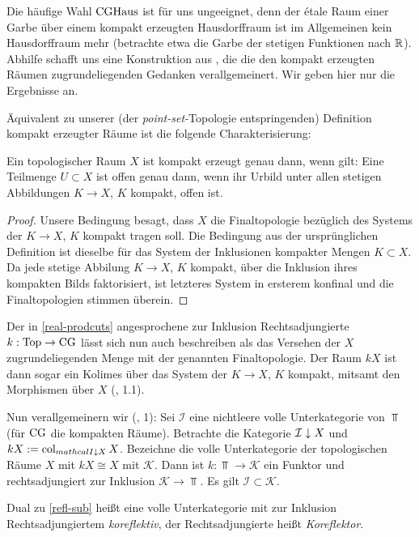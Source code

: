 Die häufige Wahl $\operatorname{CGHaus}$ ist für uns ungeeignet, denn der étale Raum
einer Garbe über einem kompakt erzeugten Hausdorffraum ist im
Allgemeinen kein Hausdorffraum mehr (betrachte etwa die Garbe der
stetigen Funktionen nach $\mathbb{R}$). Abhilfe schafft uns eine Konstruktion
aus \cite{Vogt}, die die den kompakt erzeugten Räumen
zugrundeliegenden Gedanken verallgemeinert. Wir geben hier nur die
Ergebnisse an.

Äquivalent zu unserer (der \emph{point-set-}Topologie entspringenden)
Definition kompakt erzeugter Räume ist die folgende Charakterisierung:
\begin{lemma}
  Ein topologischer Raum $X$ ist kompakt erzeugt genau dann, wenn
  gilt: Eine Teilmenge $U \subset X$ ist offen genau dann, wenn ihr
  Urbild unter allen stetigen Abbildungen $K \to X$, $K$ kompakt,
  offen ist.
\end{lemma}
\begin{proof}
  Unsere Bedingung besagt, dass $X$ die Finaltopologie bezüglich des
  Systems der $K \to X$, $K$ kompakt tragen soll. Die Bedingung aus
  der ursprünglichen Definition ist dieselbe für das System der
  Inklusionen kompakter Mengen $K \subset X$. Da jede stetige Abbilung
  $K \to X$, $K$ kompakt, über die Inklusion ihres kompakten Bilds
  faktorisiert, ist letzteres System in ersterem konfinal und die
  Finaltopologien stimmen überein.
\end{proof}
Der in \ref{real-prodcuts} angesprochene zur Inklusion
Rechtsadjungierte $k: \operatorname{Top} \to \operatorname{CG}$ lässt sich nun auch beschreiben
als das Versehen der $X$ zugrundeliegenden Menge mit der genannten
Finaltopologie. Der Raum $kX$ ist dann sogar ein Kolimes über das
System der $K \to X$, $K$ kompakt, mitsamt den Morphismen über $X$
(\cite{Vogt}, 1.1).

Nun verallgemeinern wir (\cite{Vogt}, 1): Sei $\mathcal{I}$ eine
nichtleere volle Unterkategorie von $\Top$ (für $\operatorname{CG}$ die kompakten
Räume). Betrachte die Kategorie $\mathcal{I} \downarrow \! {\scriptstyle } \, X$ und $kX
:= \operatorname{col}_{mathcal{I} \downarrow \! {\scriptstyle } \, X} X$. Bezeichne die volle
Unterkategorie der topologischen Räume $X$ mit $kX \cong X$ mit
$\mathcal{K}$. Dann ist $k: \Top \to \mathcal{K}$ ein Funktor und
rechtsadjungiert zur Inklusion $\mathcal{K} \to \Top$. Es gilt
$\mathcal{I} \subset \mathcal{K}$.
\begin{bem}
  Dual zu \ref{refl-sub} heißt eine volle Unterkategorie mit zur
  Inklusion Rechtsadjungiertem \emph{koreflektiv}, der
  Rechtsadjungierte heißt \emph{Koreflektor}.
\end{bem}

